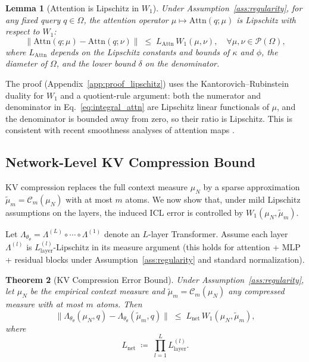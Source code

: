 \documentclass{article}
\theoremstyle{plain}
\newtheorem{theorem}{Theorem}[section]
\newtheorem{lemma}[theorem]{Lemma}
\theoremstyle{definition}
\theoremstyle{remark}
\newcommand{\OmegaSpace}{\Omega} %
\newcommand{\Pspace}{\mathcal{P}(\OmegaSpace)} %
\newcommand{\muN}{\mu_N} %
\newcommand{\tmu}{\tilde{\mu}} %
\newcommand{\Wass}[1]{W_{#1}} %
\newcommand{\Attn}{\text{Attn}}
\newcommand{\LambdaOp}{\Lambda_{\theta}} %
\newcommand{\valmap}{\phi}
\newcommand{\Compress}{\mathcal{C}_m} %
\begin{document}
\begin{lemma}[Attention is Lipschitz in $\Wass{1}$]
\label{lemma:lipschitz}
Under Assumption~\ref{ass:regularity}, for any fixed query $q \in \OmegaSpace$,  
the attention operator $\mu \mapsto \Attn(q;\mu)$ is Lipschitz with respect to $\Wass{1}$:
\begin{equation}
    \big\| \Attn(q;\mu) - \Attn(q;\nu) \big\|
    \;\le\;
    L_{\Attn} \, \Wass{1}(\mu,\nu),
    \quad \forall \mu,\nu \in \Pspace,
\end{equation}
where $L_{\Attn}$ depends on the Lipschitz constants and bounds of $\kappa$ and $\valmap$,  
the diameter of $\OmegaSpace$, and the lower bound $\delta$ on the denominator.
\end{lemma}

The proof (Appendix~\ref{app:proof_lipschitz}) uses the Kantorovich–Rubinstein duality for $\Wass{1}$ and a quotient-rule argument:  
both the numerator and denominator in Eq.~\eqref{eq:integral_attn} are Lipschitz linear functionals of $\mu$,  
and the denominator is bounded away from zero, so their ratio is Lipschitz.  
This is consistent with recent smoothness analyses of attention maps \citep{castin2024how,sander2022sinkformers}.

\subsection{Network-Level KV Compression Bound}
\label{sec:theory_compression}

KV compression replaces the full context measure $\muN$ by a sparse approximation $\tmu_m = \Compress(\muN)$ with at most $m$ atoms.  
We now show that, under mild Lipschitz assumptions on the layers, the induced ICL error is controlled by $\Wass{1}(\muN,\tmu_m)$.

Let $\LambdaOp_\theta = \Lambda^{(L)} \circ \cdots \circ \Lambda^{(1)}$ denote an $L$-layer Transformer.  
Assume each layer $\Lambda^{(l)}$ is $L_{\text{layer}}^{(l)}$-Lipschitz in its measure argument (this holds for attention + MLP + residual blocks under Assumption~\ref{ass:regularity} and standard normalization).

\begin{theorem}[KV Compression Error Bound]
\label{thm:bound}
Under Assumption~\ref{ass:regularity}, let $\muN$ be the empirical context measure and $\tmu_m = \Compress(\muN)$ any compressed measure with at most $m$ atoms. Then
\begin{equation}
    \big\|
        \LambdaOp_\theta(\muN, q)
        -
        \LambdaOp_\theta(\tmu_m, q)
    \big\|
    \;\le\;
    L_{\text{net}} \,
    \Wass{1}(\muN,\tmu_m),
\end{equation}
where
\begin{equation}
    L_{\text{net}}
    \;\coloneqq\;
    \prod_{l=1}^L L_{\text{layer}}^{(l)}.
\end{equation}
\end{theorem}
\end{document}
